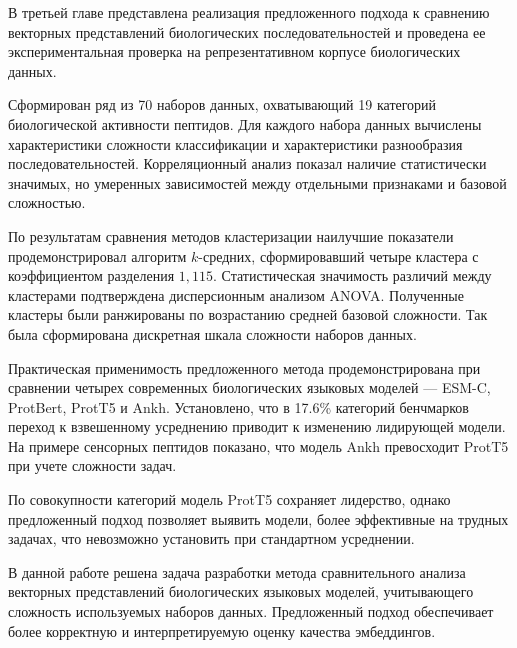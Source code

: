 \documentclass[specification,annotation,times]{itmo-student-thesis}
\begin{document}
\chapterconclusion

В третьей главе представлена реализация предложенного подхода к сравнению векторных представлений биологических последовательностей 
и проведена ее экспериментальная проверка на репрезентативном корпусе биологических данных.

Сформирован ряд из 70 наборов данных, 
охватывающий 19 категорий биологической активности пептидов. 
Для каждого набора данных вычислены характеристики сложности классификации и 
характеристики разнообразия последовательностей. 
Корреляционный анализ показал наличие статистически значимых, 
но умеренных зависимостей между отдельными признаками и базовой сложностью. 

По результатам сравнения методов кластеризации наилучшие показатели продемонстрировал 
алгоритм $k$-средних, сформировавший четыре кластера с коэффициентом разделения $1,115$. 
Статистическая значимость различий между кластерами подтверждена дисперсионным анализом ANOVA. 
Полученные кластеры были ранжированы по возрастанию средней базовой сложности. 
Так была сформирована дискретная шкала сложности наборов данных.

Практическая применимость предложенного метода продемонстрирована при сравнении 
четырех современных биологических языковых моделей — ESM-C, ProtBert, ProtT5 и Ankh. 
Установлено, что в 17.6\% категорий бенчмарков переход к взвешенному усреднению приводит к изменению лидирующей модели. 
На примере сенсорных пептидов показано, что модель Ankh превосходит ProtT5 при учете сложности задач. 

По совокупности категорий модель ProtT5 сохраняет лидерство, однако предложенный подход позволяет выявить модели, 
более эффективные на трудных задачах, что невозможно установить при стандартном усреднении.

\startconclusionpage

В данной работе решена задача разработки метода сравнительного анализа векторных представлений биологических языковых моделей, учитывающего сложность используемых наборов данных. 
Предложенный подход обеспечивает более корректную и интерпретируемую оценку качества эмбеддингов.
\end{document}
